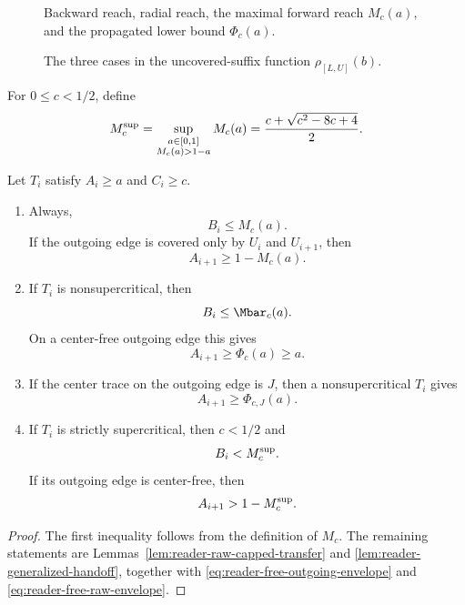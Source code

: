 \begin{figure}[H]
\centering
\resizebox{.92\linewidth}{!}{}
\caption{Backward reach, radial reach, the maximal forward reach $M_c(a)$,
and the propagated lower bound $\Phi_c(a)$.}
\label{fig:transfer-vtriangle-skeleton}
\end{figure}

\begin{figure}[H]
\centering
\resizebox{.99\linewidth}{!}{}
\caption{The three cases in the uncovered-suffix function
$\rho_{[L,U]}(b)$.}
\label{fig:transfer-residual-skeleton}
\end{figure}

\begin{definition}
\label{def:body-supercritical-envelope}
For $0\le c<1/2$, define
\[
 M_c^{\rm sup}
 =\sup_{\substack{a\in[0,1]\\M_c(a)>1-a}}M_c(a)
 =\frac{c+\sqrt{c^2-8c+4}}2.
\]
\end{definition}

\begin{proposition}
\label{prop:body-transfer-interface}
Let $T_i$ satisfy $A_i\ge a$ and $C_i\ge c$.
\begin{enumerate}
\item Always,
\[
 B_i\le M_c(a).
\]
If the outgoing edge is covered only by $U_i$ and $U_{i+1}$, then
\[
 A_{i+1}\ge1-M_c(a).
\]
\item If $T_i$ is nonsupercritical, then
\[
 B_i\le\Mbar_c(a).
\]
On a center-free outgoing edge this gives
\[
 A_{i+1}\ge\Phi_c(a)\ge a.
\]
\item If the center trace on the outgoing edge is $J$, then a
nonsupercritical $T_i$ gives
\[
 A_{i+1}\ge\Phi_{c,J}(a).
\]
\item If $T_i$ is strictly supercritical, then $c<1/2$ and
\[
 B_i<M_c^{\rm sup}.
\]
If its outgoing edge is center-free, then
\[
 A_{i+1}>1-M_c^{\rm sup}.
\]
\end{enumerate}
\end{proposition}

\begin{proof}
The first inequality follows from the definition of $M_c$.  The remaining
statements are Lemmas~\ref{lem:reader-raw-capped-transfer} and
\ref{lem:reader-generalized-handoff}, together with
\eqref{eq:reader-free-outgoing-envelope} and
\eqref{eq:reader-free-raw-envelope}.
\end{proof}


